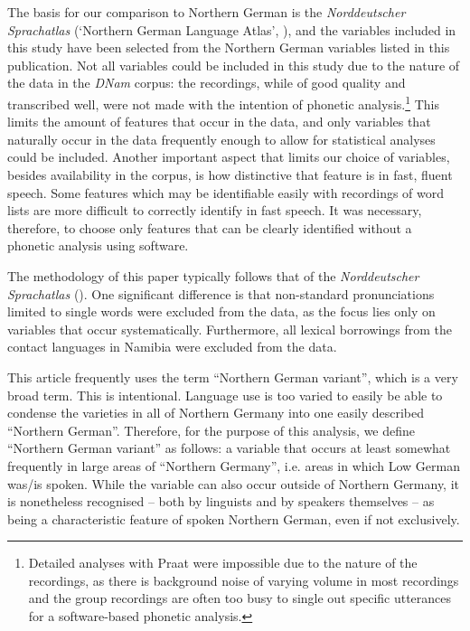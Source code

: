 \documentclass[output=paper]{langsci/langscibook}
\begin{document}
The basis for our comparison to Northern German is the \textit{Norddeutscher Sprachatlas} (‘Northern German Language Atlas’, \citealt{elmentaler_norddeutscher_2015}), and the variables included in this study have been selected from the Northern German variables listed in this publication. Not all variables could be included in this study due to the nature of the data in the \textit{DNam} corpus: the recordings, while of good quality and transcribed well, were not made with the intention of phonetic analysis.\footnote{Detailed analyses with Praat were impossible due to the nature of the recordings, as there is background noise of varying volume in most recordings and the group recordings are often too busy to single out specific utterances for a software-based phonetic analysis.} This limits the amount of features that occur in the data, and only variables that naturally occur in the data frequently enough to allow for statistical analyses could be included. Another important aspect that limits our choice of variables, besides availability in the corpus, is how distinctive that feature is in fast, fluent speech. Some features which may be identifiable easily with recordings of word lists are more difficult to correctly identify in fast speech. It was necessary, therefore, to choose only features that can be clearly identified without a phonetic analysis using software. 

The methodology of this paper typically follows that of the \textit{Norddeutscher Sprachatlas} (\citealt{elmentaler_norddeutscher_2015}). One significant difference is that non-standard pronunciations limited to single words were excluded from the data, as the focus lies only on variables that occur systematically. Furthermore, all lexical borrowings from the contact languages in Namibia were excluded from the data. 

This article frequently uses the term “Northern German variant”, which is a very broad term. This is intentional. Language use is too varied to easily be able to condense the varieties in all of Northern Germany into one easily described “Northern German”. Therefore, for the purpose of this analysis, we define “Northern German variant” as follows: a variable that occurs at least somewhat frequently in large areas of “Northern Germany”, i.e. areas in which Low German was/is spoken. While the variable can also occur outside of Northern Germany, it is nonetheless recognised – both by linguists and by speakers themselves – as being a characteristic feature of spoken Northern German, even if not exclusively.
\end{document}
